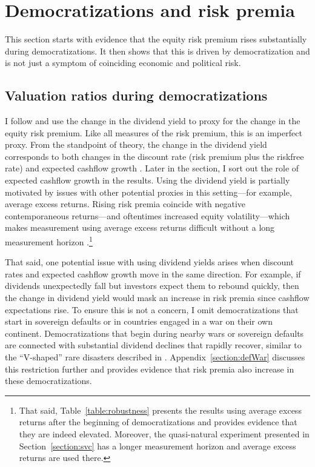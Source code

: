 
\section{Democratizations and risk premia}\label{section:facts}

This section starts with evidence that the equity risk premium rises substantially during democratizations. It then shows that this is driven by democratization and is not just a symptom of coinciding economic and political risk. 

\subsection{Valuation ratios during democratizations}\label{section:mainfact}

I follow \cite{Muir2017} and use the change in the dividend yield to proxy for the change in the equity risk premium. Like all measures of the risk premium, this is an imperfect proxy.  From the standpoint of theory, the change in the dividend yield corresponds to both changes in the discount rate (risk premium plus the riskfree rate) and expected cashflow growth \citep{Gordon1959,Campbell1988,Fama1988}.  Later in the section, I sort out the role of expected cashflow growth in the results. Using the dividend yield is partially motivated by issues with other potential proxies in this setting---for example, average excess returns.  Rising risk premia coincide with negative contemporaneous returns---and oftentimes increased equity volatility---which makes measurement using average excess returns difficult without a long measurement horizon \citep{Merton1980}.\footnote{That said, Table~\ref{table:robustness} presents the results using average excess returns after the beginning of democratizations and provides evidence that they are indeed elevated. Moreover, the quasi-natural experiment presented in Section~\ref{section:svc} has a longer measurement horizon and average excess returns are used there.}

\label{par:democratization_wars}
That said, one potential issue with using dividend yields arises when discount rates and expected cashflow growth move in the same direction. For example,  if dividends unexpectedly fall but investors expect them to rebound quickly, then the change in dividend yield would mask an increase in risk premia since cashflow expectations rise.  To ensure this is not a concern, I omit democratizations that start in sovereign defaults or in countries engaged in a war on their own continent.  Democratizations that begin during nearby wars or sovereign defaults are connected with substantial dividend declines that rapidly recover, similar to the ``V-shaped'' rare disasters described in \cite*{Barro2013}. Appendix~\ref{section:defWar} discusses this restriction further and provides evidence that risk premia also increase in these democratizations. 

